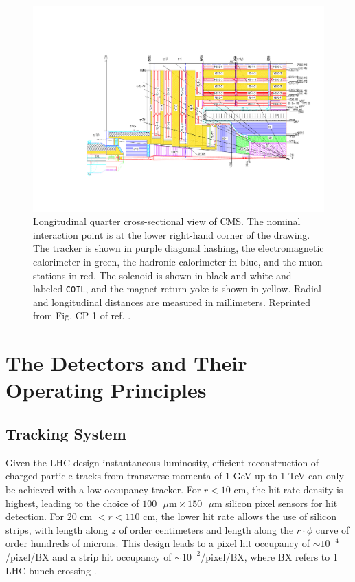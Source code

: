 \documentclass[dissertation.tex]{subfiles}
\begin{document}
\begin{figure}
	\centering
	\includegraphics[scale=0.5]{CMS_longitudinal_xsec}
	\caption{Longitudinal quarter cross-sectional view of CMS.  The nominal interaction point is at the lower right-hand corner of the drawing.  The tracker is shown in purple diagonal hashing, the electromagnetic calorimeter in green, the hadronic calorimeter in blue, and the muon stations in red.  The solenoid is shown in black and white and labeled \texttt{COIL}, and the magnet return yoke is shown in yellow.  Radial and longitudinal distances are measured in millimeters.  Reprinted from Fig. CP 1 of ref. \cite{CMS_TDR}.}
	\label{fig:CMS_longitudinal_xsec}
\end{figure}

\section{The Detectors and Their Operating Principles}
\label{sec:The Detectors and Their Operating Principles}


\subsection{Tracking System}
\label{sec:Tracking System}

Given the LHC design instantaneous luminosity, efficient reconstruction of charged particle tracks from transverse momenta of 1 GeV up to 1 TeV can only be achieved with a low occupancy tracker.  For $r < 10$ cm, the hit rate density is highest, leading to the choice of $100\mbox{ }\mu\mbox{m} \times 150\mbox{ }\mu\mbox{m}$ silicon pixel sensors for hit detection.  For $20\mbox{ cm }< r < 110\mbox{ cm}$, the lower hit rate allows the use of silicon strips, with length along $z$ of order centimeters and length along the $r\cdot\phi$ curve of order hundreds of microns.  This design leads to a pixel hit occupancy of $\sim10^{-4}$/pixel/BX and a strip hit occupancy of $\sim10^{-2}$/pixel/BX, where BX refers to 1 LHC bunch crossing \cite{CMS_detector_paper}.
\end{document}
